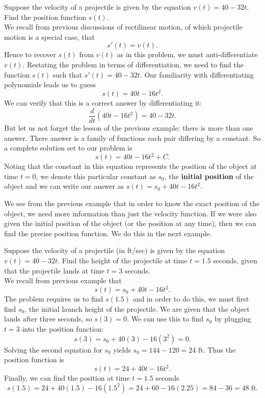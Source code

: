 \documentclass{ximera}
\begin{document}
\begin{example}[example 2]
Suppose the velocity of a projectile is given by the equation $v(t) = 40 - 32t$. Find the position function $s(t)$.\\
We recall from previous discussions of rectilinear motion, of which projectile motion is a special case, that
\[
s'(t) = v(t).
\]
Hence to recover $s(t)$ from $v(t)$ as in this problem, we must anti-differentiate $v(t)$.
Restating the problem in terms of differentiation, we need to find the function $s(t)$ such that $s'(t) = 40 - 32t$.
Our familiarity with differentiating polynomials leads us to guess
\[
s(t) = 40t - 16t^2.
\]
We can verify that this is a correct answer by differentiating it:
\[
\frac{d}{dt}\left(40t - 16t^2\right) = 40 - 32t.
\]
But let us not forget the lesson of the previous example: there is more than one answer.  There answer is a family of functions
each pair differing by a constant. So a complete solution set to our problem is
\[
s(t) = 40t - 16t^2 + C.
\]
Noting that the constant in this equation represents the position of the object at time $t = 0$,
we denote this particular constant as $s_0$, the \textbf{initial position} of the object and we can write our answer as 
$s(t) = s_0 + 40t - 16t^2$.


\end{example}






We see from the previous example that in order to know the exact position of the object, 
we need more information than just the velocity function.
If we were also given the initial position of the object (or the position at any time), 
then we can find the precise position function.
We do this in the next example.

\begin{example}[example 3]
Suppose the velocity of a projectile (in ft/sec) is given by the equation $v(t) = 40 - 32t$. 
Find the height of the projectile at time $t = 1.5$ seconds, 
given that the projectile lands at time $t = 3$ seconds. \\

We recall from previous example that 
\[
s(t) = s_0 + 40t - 16t^2.
\]
The problem requires us to find $s(1.5)$ and in order to do this, we must first find $s_0$, 
the initial launch height of the projectile.
We are given that the object lands after three seconds, so $s(3) = 0$. We can use this to find $s_0$
by plugging $t=3$ into the position function:
\[
s(3) = s_0 + 40(3) - 16(3^2) = 0.
\]
Solving the second equation for $s_0$ yields $s_0 = 144 - 120 = 24$ ft.
Thus the position function is
\[
s(t) = 24 + 40t - 16t^2.
\]
Finally, we can find the position at time $t=1.5$ seconds
\[
s(1.5) = 24 + 40(1.5) - 16(1.5^2) = 24 + 60 - 16(2.25) = 84 - 36 = 48 \; \text{ft}.
\]
\end{example}
\end{document}
